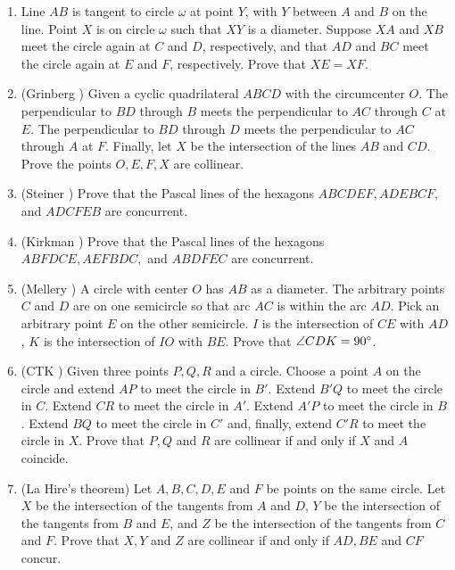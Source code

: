 \documentclass[11pt,paper=letter]{scrartcl}
\begin{document}
\begin{enumerate}

\item Line $AB$ is tangent to circle $\omega$ at point $Y$, with $Y$ between $A$ and $B$ on the line. Point $X$ is on circle $\omega$ such that $XY$ is a diameter. Suppose $XA$ and $XB$ meet the circle again at $C$ and $D$, respectively, and that $AD$ and $BC$ meet the circle again at $E$ and $F$, respectively. Prove that $XE = XF$.

\item (Grinberg \cite{CTK3}) Given a cyclic quadrilateral $ABCD$ with the circumcenter $O$. The perpendicular to $BD$ through $B$ meets the perpendicular to $AC$ through $C$ at $E$. The perpendicular to $BD$ through $D$ meets the perpendicular to $AC$ through $A$ at $F$. Finally, let $X$ be the intersection of the lines $AB$ and $CD$. Prove the points $O, E, F, X$ are collinear.

\item (Steiner \cite{CTK1}) Prove that the Pascal lines of the hexagons $ABCDEF, ADEBCF,$ and $ADCFEB$ are concurrent.

\item (Kirkman \cite{CTK1}) Prove that the Pascal lines of the hexagons $ABFDCE, AEFBDC,$ and $ABDFEC$ are concurrent.

\item (Mellery \cite{CTK9}) A circle with center $O$ has $AB$ as a diameter. The arbitrary points $C$ and $D$ are on one semicircle so that arc $AC$ is within the arc $AD$. Pick an arbitrary point $E$ on the other semicircle. $I$ is the intersection of $CE$ with $AD$, $K$ is the intersection of $IO$ with $BE$. Prove that $\angle CDK = 90^\circ$.

\item (CTK \cite{CTK5}) Given three points $P, Q, R$ and a circle. Choose a point $A$ on the circle and extend $AP$ to meet the circle in $B'$. Extend $B'Q$ to meet the circle in $C$. Extend $CR$ to meet the circle in $A'$. Extend $A'P$ to meet the circle in $B$. Extend $BQ$ to meet the circle in $C'$ and, finally, extend $C'R$ to meet the circle in $X$. Prove that $P, Q$ and $R$ are collinear if and only if $X$ and $A$ coincide.

\item (La Hire's theorem) Let $A, B, C, D, E$ and $F$ be points on the same circle. Let $X$ be the intersection of the tangents from $A$ and $D$, $Y$ be the intersection of the tangents from $B$ and $E$, and $Z$ be the intersection of the tangents from $C$ and $F$. Prove that $X, Y$ and $Z$ are collinear if and only if $AD, BE$ and $CF$ concur.

\end{enumerate}
\end{document}
